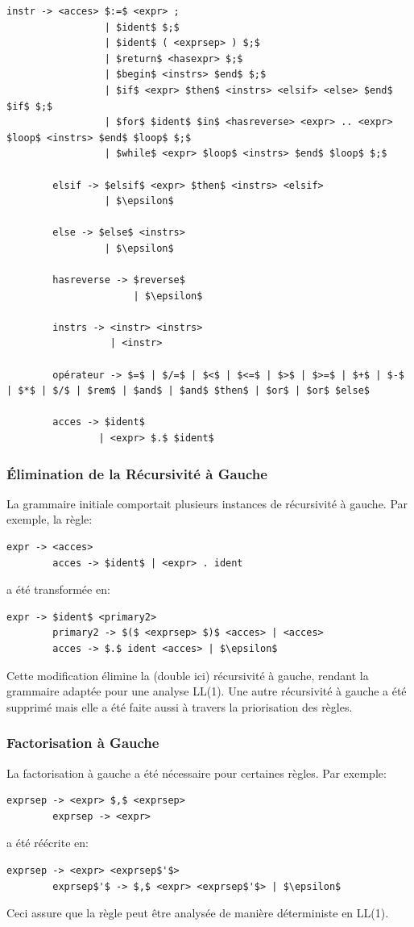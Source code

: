 \documentclass[french,a4paper]{article}
\begin{document}
\begin{lstlisting}[label={lst:lstlisting}]
        instr -> <acces> $:=$ <expr> ;
                 | $ident$ $;$
                 | $ident$ ( <exprsep> ) $;$
                 | $return$ <hasexpr> $;$
                 | $begin$ <instrs> $end$ $;$
                 | $if$ <expr> $then$ <instrs> <elsif> <else> $end$ $if$ $;$
                 | $for$ $ident$ $in$ <hasreverse> <expr> .. <expr> $loop$ <instrs> $end$ $loop$ $;$
                 | $while$ <expr> $loop$ <instrs> $end$ $loop$ $;$

        elsif -> $elsif$ <expr> $then$ <instrs> <elsif>
                 | $\epsilon$

        else -> $else$ <instrs>
                 | $\epsilon$

        hasreverse -> $reverse$
                      | $\epsilon$

        instrs -> <instr> <instrs>
                  | <instr>

        opérateur -> $=$ | $/=$ | $<$ | $<=$ | $>$ | $>=$ | $+$ | $-$ | $*$ | $/$ | $rem$ | $and$ | $and$ $then$ | $or$ | $or$ $else$

        acces -> $ident$
                | <expr> $.$ $ident$

    \end{lstlisting}

    \subsubsection{Élimination de la Récursivité à Gauche}
    La grammaire initiale comportait plusieurs instances de récursivité à gauche.
    Par exemple, la règle:
    \begin{lstlisting}[label={lst:lstlisting2}]
        expr -> <acces>
        acces -> $ident$ | <expr> . ident
    \end{lstlisting}
    a été transformée en:
    \begin{lstlisting}[label={lst:lstlisting3}]
        expr -> $ident$ <primary2>
        primary2 -> $($ <exprsep> $)$ <acces> | <acces>
        acces -> $.$ ident <acces> | $\epsilon$
    \end{lstlisting}
    Cette modification élimine la (double ici) récursivité à gauche, rendant la grammaire adaptée pour une analyse LL(1).
    Une autre récursivité à gauche a été supprimé mais elle a été faite aussi à travers la priorisation des règles.

    \subsubsection{Factorisation à Gauche}
    La factorisation à gauche a été nécessaire pour certaines règles.
    Par exemple:
    \begin{lstlisting}[label={lst:lstlisting4}]
        exprsep -> <expr> $,$ <exprsep>
        exprsep -> <expr>
    \end{lstlisting}
    a été réécrite en:
    \begin{lstlisting}[label={lst:lstlisting5}]
        exprsep -> <expr> <exprsep$'$>
        exprsep$'$ -> $,$ <expr> <exprsep$'$> | $\epsilon$
    \end{lstlisting}
    Ceci assure que la règle peut être analysée de manière déterministe en LL(1).
\end{document}
